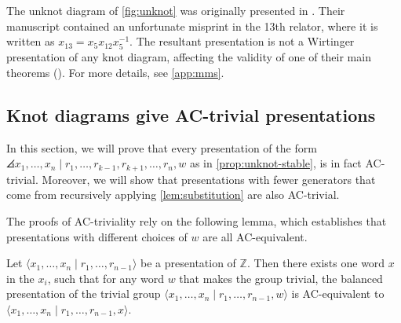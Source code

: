 {%


\begin{remark}
The unknot diagram of \autoref{fig:unknot} was originally presented in \cite{MMS}. Their manuscript contained an unfortunate misprint in the 13th relator, where it is written as $x_{13}=x_5 x_{12} x_5^{-1}$.  The resultant presentation is not a Wirtinger presentation of any knot diagram, affecting the validity of one of their main theorems (\cite[Theorem 1.4]{MMS}). For more details, see \autoref{app:mms}.
\end{remark}


\subsection{Knot diagrams give AC-trivial presentations} \label{sec:proofs}
In this section, we will prove that every presentation of the form  
 $\angles{ x_1,\ldots, x_n \mid r_1,\ldots, r_{k-1}, r_{k+1},\ldots, r_n, w}$ as in \autoref{prop:unknot-stable}, is in fact AC-trivial. Moreover, we will show that presentations with fewer generators that come from recursively applying \autoref{lem:substitution} are also AC-trivial. 

The proofs of AC-triviality rely on the following lemma, which establishes that presentations with different choices of $w$ are all AC-equivalent. 

\begin{lemma}
\label{lem:all_ac_equiv}
    Let $\langle x_1,\ldots, x_n \mid r_1,\ldots,r_{n-1}\rangle$ be a presentation of $\mathbb{Z}$. Then there exists one word $x$ in the $x_i$, such that for any word $w$ that makes the group trivial, the balanced presentation of the trivial group $\langle x_1,\ldots, x_n \mid r_1,\ldots,r_{n-1}, w\rangle$ is AC-equivalent to $\langle x_1,\ldots, x_n \mid r_1,\ldots,r_{n-1}, x\rangle$.
\end{lemma}

}
